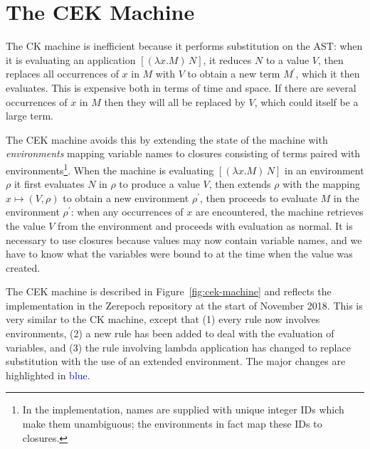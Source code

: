 \documentclass[a4paper]{article}
\newcommand\blue[1]{\textcolor{blue}{#1}}
\begin{document}

\newpage



\newpage


\section{The CEK Machine}
The CK machine is inefficient because it performs substitution on the
AST: when it is evaluating an application $[(\lambda x.M)\, N]$, it
reduces $N$ to a value $V$, then replaces all occurrences of $x$ in
$M$ with $V$ to obtain a new term $M^\prime$, which it then evaluates.
This is expensive both in terms of time and space.  If there are
several occurrences of $x$ in $M$ then they will all be replaced by
$V$, which could itself be a large term.

The CEK machine avoids this by extending the state of the machine with
\textit{environments} mapping variable names to closures consisting of
terms paired with environments\footnote{In the implementation, names
  are supplied with unique integer IDs which make them unambiguous;
  the environments in fact map these IDs to closures.}.  When the
machine is evaluating $[(\lambda x.M)\, N]$ in an environment $\rho$ it
first evaluates $N$ in $\rho$ to produce a value $V$, then extends
$\rho$ with the mapping $x \mapsto (V,\rho)$ to obtain a new
environment $\rho^{\prime}$, then proceeds to evaluate $M$ in the
environment $\rho^\prime$: when any occurrences of $x$ are encountered,
the machine retrieves the value $V$ from the environment and proceeds
with evaluation as normal.  It is necessary to use closures because
values may now contain variable names, and we have to know what the
variables were bound to at the time when the value was created.


The CEK machine is described in Figure~\ref{fig:cek-machine} and
reflects the implementation in the Zerepoch repository at the start of
November 2018.  This is very similar to the CK machine, except that
(1) every rule now involves environments, (2) a new rule has been
added to deal with the evaluation of variables, and (3) the rule
involving lambda application has changed to replace substitution with
the use of an extended environment. The major changes are
highlighted in \blue{blue}.
\end{document}
